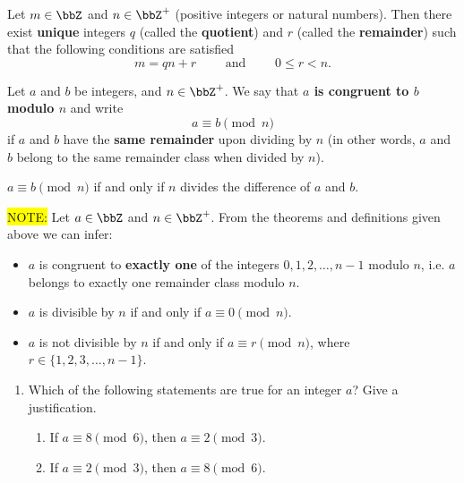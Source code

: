 \documentclass[11pt]{article}
\newcounter{Quesnumb}  %
\newcommand{\problemnum}{%
            \addtocounter{Quesnumb}{1}%
            \arabic{Quesnumb}}
\begin{document}
\begin{problem}{\problemnum}
\begin{tcolorbox}[colback=red!10!white, colframe=red!50!blue, title=Euclid's division algorithm \& Congruences, center title]
\begin{theorem}
Let $m \in \bbZ$ and $n \in \bbZ^{+}$ (positive integers or natural numbers). Then there exist \textbf{unique} integers $q$ (called the \textbf{quotient}) and $r$ (called the \textbf{remainder}) such that the following conditions are satisfied
\[m=qn+r \qquad \text{ and } \qquad 0 \leq r <n.\]
\end{theorem}
\begin{define}
Let $a$ and $b$ be integers, and $n \in \bbZ^{+}$. We say that \textbf{$a$ is congruent to $b$ modulo $n$} and write
\[a \equiv b \pmod{n}\]
if $a$ and $b$ have the \textbf{same remainder} upon dividing by $n$ (in other words, $a$ and $b$ belong to the same remainder class when divided by $n$).
\end{define}

\begin{theorem}
    $a \equiv b \pmod{n}$ if and only if $n$ divides the difference of $a$ and $b$.
\end{theorem}
\end{tcolorbox}
\colorbox{yellow}{\textsf{NOTE:}} Let $a \in \bbZ$ and $n \in \bbZ^{+}$. From the theorems and definitions given above we can infer:
    \begin{itemize}
        \item $a$ is congruent to \textbf{exactly one} of the integers $0,1,2, \ldots, n-1$ modulo $n$, i.e. $a$ belongs to exactly one remainder class modulo $n$.
        \item $a$ is divisible by $n$ if and only if $a \equiv 0 \pmod{n}$.
        \item $a$ is not divisible by $n$ if and only if $a \equiv r \pmod{n}$, where $r \in \{1,2,3, \ldots ,n-1\}$.
    \end{itemize}
\begin{enumerate}[label=\alph*).]
\item Which of the following statements are true for an integer $a$? Give a justification.
    \begin{enumerate}[label=\roman*).]
        \item If $a \equiv 8 \pmod{6}$, then $a \equiv 2 \pmod{3}$.
        \item If $a \equiv 2 \pmod{3}$, then $a \equiv 8 \pmod{6}$.
    \end{enumerate}


\end{enumerate}
\end{problem}
\end{document}
